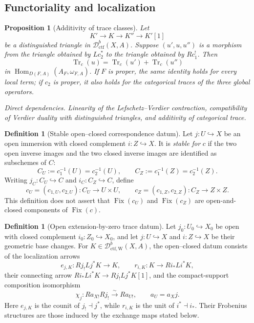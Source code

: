 \documentclass[10pt]{article}
\newtheorem{proposition}[theorem]{Proposition}
\theoremstyle{definition}
\newtheorem{definition}[theorem]{Definition}
\newcommand{\Dctf}{\mathcal D^b_{\mathrm{ctf}}}
\newcommand{\DctfW}{\mathcal D^b_{\mathrm{ctf},\mathrm W}}
\newcommand{\Fix}{\operatorname{Fix}}
\newcommand{\Hom}{\operatorname{Hom}}
\newcommand{\depends}[1]{\par\smallskip\noindent\textit{Direct dependencies.} #1\par}
\begin{document}
\subsection{Functoriality and localization}

\begin{proposition}[Additivity of trace classes]
Let
\[
 K'\longrightarrow K\longrightarrow K''\longrightarrow K'[1]
\]
be a distinguished triangle in \(\Dctf(X,A)\).  Suppose
\((u',u,u'')\) is a morphism from the triangle obtained by \(Lc_2^*\) to
the triangle obtained by \(Rc_1^!\).  Then
\[
 \operatorname{Tr}_c(u)=
 \operatorname{Tr}_c(u')+\operatorname{Tr}_c(u'')
\]
in \(\Hom_{D(F,A)}(A_F,\omega_{F,A})\).  If \(F\) is proper, the same
identity holds for every local term; if \(c_2\) is proper, it also holds for
the categorical traces of the three global operators.
\depends{Linearity of the Lefschetz--Verdier contraction, compatibility of Verdier duality
with distinguished triangles, and additivity of categorical trace.}
\end{proposition}

\begin{definition}[Stable open--closed correspondence datum]
Let \(j:U\hookrightarrow X\) be an open immersion with closed complement
\(i:Z\hookrightarrow X\).  It is \emph{stable for} \(c\) if the two open
inverse images and the two closed inverse images are identified as
subschemes of \(C\):
\[
 C_U:=c_1^{-1}(U)=c_2^{-1}(U),
 \qquad
 C_Z:=c_1^{-1}(Z)=c_2^{-1}(Z).
\]
Writing \(j_C:C_U\hookrightarrow C\) and \(i_C:C_Z\hookrightarrow C\),
define
\[
 c_U=(c_{1,U},c_{2,U}):C_U\to U\times U,
 \qquad
 c_Z=(c_{1,Z},c_{2,Z}):C_Z\to Z\times Z.
\]
This definition does not assert that \(\Fix(c_U)\) and \(\Fix(c_Z)\) are
open-and-closed components of \(\Fix(c)\).
\end{definition}

\begin{definition}[Open extension-by-zero trace datum]
Let \(j_0:U_0\hookrightarrow X_0\) be open with closed complement
\(i_0:Z_0\hookrightarrow X_0\), and let \(j:U\hookrightarrow X\) and
\(i:Z\hookrightarrow X\) be their geometric base changes.  For
\(K\in\DctfW(X,A)\), the open--closed datum consists of the localization
arrows
\[
 e_{j,K}:Rj_!Lj^*K\longrightarrow K,
 \qquad
 r_{i,K}:K\longrightarrow Ri_*Li^*K,
\]
their connecting arrow
\(Ri_*Li^*K\to Rj_!Lj^*K[1]\), and the compact-support composition
isomorphism
\[
 \chi_j:Ra_{X!}Rj_!\xrightarrow{\sim}Ra_{U!},
 \qquad a_U=a_Xj.
\]
Here \(e_{j,K}\) is the counit of \(j_!\dashv j^*\), while \(r_{i,K}\)
is the unit of \(i^*\dashv i_*\).  Their Frobenius structures are those
induced by the exchange maps stated below.
\end{definition}
\end{document}

